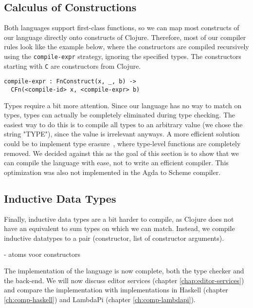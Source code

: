\subsection{Calculus of Constructions}
Both languages support first-class functions, so we can map most constructs of our language directly onto constructs of Clojure. Therefore, most of our compiler rules look like the example below, where the constructors are compiled recursively using the \verb|compile-expr| strategy, ignoring the specified types. The constructors starting with \verb|C| are constructors from Clojure. 
\begin{lstlisting}
compile-expr : FnConstruct(x, _, b) -> 
  CFn(<compile-id> x, <compile-expr> b)
\end{lstlisting}

Types require a bit more attention. Since our language has no way to match on types, types can actually be completely eliminated during type checking. The easiest way to do this is to compile all types to an arbitrary value (we chose the string "TYPE"), since the value is irrelevant anyways. A more efficient solution could be to implement type erasure~\cite[Section 23.6]{tapl}, where type-level functions are completely removed. We decided against this as the goal of this section is to show that we can compile the language with ease, not to write an efficient compiler. This optimization was also not implemented in the Agda to Scheme compiler.

\subsection{Inductive Data Types}

Finally, inductive data types are a bit harder to compile, as Clojure does not have an equivalent to sum types on which we can match. Instead, we compile inductive datatypes to a pair (constructor, list of constructor arguments). 


- atoms voor constructors

The implementation of the language is now complete, both the type checker and the back-end. We will now discuss editor services (chapter \ref{chap:editor-services}) and compare the implementation with implementations in Haskell (chapter \ref{ch:comp-haskell}) and LambdaPi (chapter \ref{ch:comp-lambdapi}).